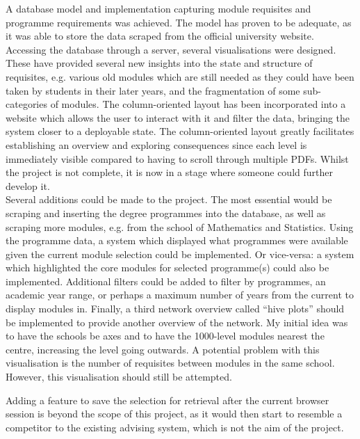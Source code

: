 A database model and implementation capturing module requisites and programme
requirements was achieved. The model has proven to be adequate, as it was able
to store the data scraped from the official university website. Accessing the
database through a server, several visualisations were designed. These have
provided several new insights into the state and structure of requisites, e.g.
various old modules which are still needed as they could have been taken by
students in their later years, and the fragmentation of some sub-categories of
modules. The column-oriented layout has been incorporated into a website which
allows the user to interact with it and filter the data, bringing the system
closer to a deployable state. The column-oriented layout greatly facilitates
establishing an overview and exploring consequences since each level is
immediately visible compared to having to scroll through multiple PDFs. Whilst
the project is not complete, it is now in a stage where someone could further
develop it.
\\

Several additions could be made to the project. The most essential would be
scraping and inserting the degree programmes into the database, as well as
scraping more modules, e.g. from the school of Mathematics and Statistics. Using
the programme data, a system which displayed what programmes were available
given the current module selection could be implemented. Or vice-versa: a system
which highlighted the core modules for selected programme(s) could also be
implemented. Additional filters could be added to filter by programmes, an
academic year range, or perhaps a maximum number of years from the current to
display modules in. Finally, a third network overview called ``hive plots''
should be implemented to provide another overview of the network. My initial
idea was to have the schools be axes and to have the 1000-level modules nearest
the centre, increasing the level going outwards. A potential problem with this
visualisation is the number of requisites between modules in the same school.
However, this visualisation should still be attempted.

Adding a feature to save the selection for retrieval after the current browser
session is beyond the scope of this project, as it would then start to resemble
a competitor to the existing advising system, which is not the aim of the
project.
